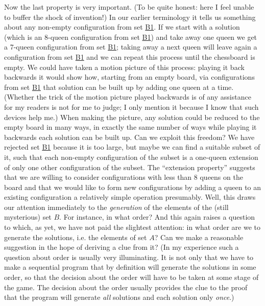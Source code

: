 Now the last property is very important. (To be quite honest: here I feel unable to buffer the shock of invention!) In our earlier terminology it tells us something about any non-empty configuration from set \hyperref[en:b1-eight-queens]{B1}. If we start with a solution (which is an 8-queen configuration from set \hyperref[en:b1-eight-queens]{B1}) and take away one queen we get a 7-queen configuration from set \hyperref[en:b1-eight-queens]{B1}; taking away a next queen will leave again a configuration from set \hyperref[en:b1-eight-queens]{B1} and we can repeat this process until the chessboard is empty. We could have taken a motion picture of this process: playing it back backwards it would show how, starting from an empty board, via configurations from set \hyperref[en:b1-eight-queens]{B1} that solution can be built up by adding one queen at a time. (Whether the trick of the motion picture played backwards is of any assistance for my readers is not for me to judge; I only mention it because I know that such devices help me.) When making the picture, any solution could be reduced to the empty board in many ways, in exactly the same number of ways \textemdash{}  while playing it backwards \textemdash{}  each solution can be built up. Can we exploit this freedom? We have rejected set \hyperref[en:b1-eight-queens]{B1} because it is too large, but maybe we can find a suitable subset of it, such that each non-empty configuration of the subset is a one-queen extension of only one other configuration of the subset. The ``extension property'' suggests that we are willing to consider configurations with less than 8 queens on the board and that we would like to form new configurations by adding a queen to an existing configuration \textemdash{}  a relatively simple operation presumably. Well, this draws our attention immediately to the \textit{generation} of the elements of the (still mysterious) set $B$. For instance, in what order? And this again raises a question to which, as yet, we have not paid the slightest attention: in what order are we to generate the solutions, i.e. the elements of set $A$? Can we make a reasonable suggestion in the hope of deriving a clue from it? (In my experience such a question about order is usually very illuminating. It is not only that we have to make a sequential program that by definition will generate the solutions in some order, so that the decision about the order will have to be taken at some stage of the game. The decision about the order usually provides the clue to the proof that the program will generate \textit{all} solutions and each solution only \textit{once}.)

